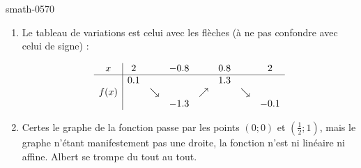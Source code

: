 \begin{corrige}{smath-0570}
\begin{enumerate}
    \item

        Le tableau de variations est celui avec les flèches (à ne pas confondre avec celui de signe) :

        \begin{equation*}
            \begin{array}[]{c|ccccccc}
                x&2&&-0.8&&0.8&&2\\
                \hline
                &0.1&&&&1.3&&\\
                f(x)&&\searrow&&\nearrow&&\searrow&\\
                &&&-1.3&&&&-0.1\\
            \end{array}
        \end{equation*}
        
    \item

        Certes le graphe de la fonction passe par les points \( (0;0)\) et \( (\frac{ 1 }{2};1)\), mais le graphe n'étant manifestement pas une droite, la fonction n'est ni linéaire ni affine. Albert se trompe du tout au tout.

\end{enumerate}


\end{corrige}
